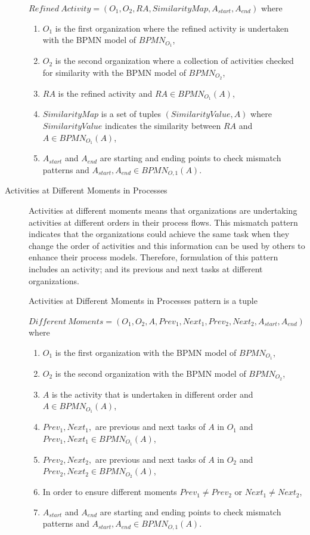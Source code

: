 \begin{description}
\begin{definition}
		${Refined\ Activity} = (O_{1}, O_{2}, RA, SimilarityMap, A_{start}, A_{end}) $ where 
		\begin{enumerate}
		  \item $O_{1}$ is the first organization where the refined activity is undertaken with the BPMN model of $BPMN_{{O}_{1}}$,
		  \item $O_{2}$ is the second organization where a collection of activities checked for similarity with the BPMN model of $BPMN_{{O}_{2}}$,
		  \item $RA$ is the refined activity and $RA \in BPMN_{{O}_{1}}(A)$,
		  \item $SimilarityMap$ is a set of tuples $(SimilarityValue, A)$ where $SimilarityValue$ indicates the similarity between $RA$ and $A \in BPMN_{{O}_{1}}(A)$, 
 		  \item $A_{start}$ and $A_{end}$ are starting and ending points to check mismatch patterns and $A_{start}, A_{end} \in BPMN_{O,1}(A)$.
		\end{enumerate}
		\end{definition}
   \item[Activities at Different Moments in Processes] Activities at different moments means that organizations are undertaking activities at different orders in their process flows. This mismatch pattern indicates that the organizations could achieve the same task when they change the order of activities and this information can be used by others to enhance their process models. Therefore, formulation of this pattern includes an activity; and its previous and next tasks at different organizations.
		\theoremstyle{definition}
		\begin{definition}
		Activities at Different Moments in Processes pattern is a tuple 

		${Different\ Moments} = (O_{1}, O_{2}, A, Prev_{1}, Next_{1},Prev_{2}, Next_{2}, A_{start}, A_{end}) $ where 
		\begin{enumerate}
		  \item $O_{1}$ is the first organization with the BPMN model of $BPMN_{{O}_{1}}$,
		  \item $O_{2}$ is the second organization with the BPMN model of $BPMN_{{O}_{2}}$,
		  \item $A$ is the activity that is undertaken in different order and $A \in BPMN_{{O}_{1}}(A)$,
		  \item $Prev_{1}, Next_{1},$ are previous and next tasks of $A$ in $O_{1}$ and  $Prev_{1}, Next_{1} \in  BPMN_{{O}_{1}}(A)$,
  		  \item $Prev_{2}, Next_{2},$ are previous and next tasks of $A$ in $O_{2}$ and  $Prev_{2}, Next_{2} \in  BPMN_{{O}_{2}}(A)$,
  		  \item In order to ensure different moments $Prev_{1} \neq Prev_{2}$ or $Next_{1} \neq Next_{2}$,
 		  \item $A_{start}$ and $A_{end}$ are starting and ending points to check mismatch patterns and $A_{start}, A_{end} \in BPMN_{O,1}(A)$.
		\end{enumerate}
		\end{definition}


\end{description}
